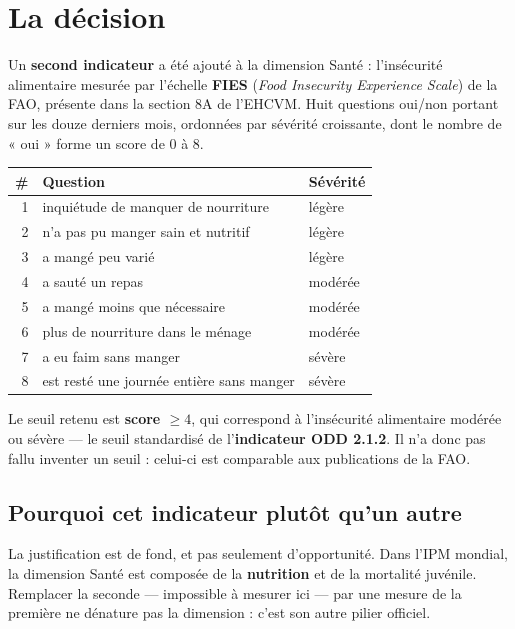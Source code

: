 \documentclass[11pt,a4paper]{article}
\begin{document}
\section{La décision}

Un \textbf{second indicateur} a été ajouté à la dimension Santé : l'insécurité alimentaire mesurée
par l'échelle \textbf{FIES} (\emph{Food Insecurity Experience Scale}) de la FAO, présente dans la
section 8A de l'EHCVM. Huit questions oui/non portant sur les douze derniers mois, ordonnées par
sévérité croissante, dont le nombre de « oui » forme un score de 0 à 8.

\begin{center}
\small
\begin{tabular}{@{}rlp{2.6cm}@{}}
\toprule
\textbf{\#} & \textbf{Question} & \textbf{Sévérité} \\
\midrule
1 & inquiétude de manquer de nourriture & légère \\
2 & n'a pas pu manger sain et nutritif & légère \\
3 & a mangé peu varié & légère \\
4 & a sauté un repas & modérée \\
5 & a mangé moins que nécessaire & modérée \\
6 & plus de nourriture dans le ménage & modérée \\
7 & a eu faim sans manger & sévère \\
8 & est resté une journée entière sans manger & sévère \\
\bottomrule
\end{tabular}
\end{center}

Le seuil retenu est \textbf{score $\ge 4$}, qui correspond à l'insécurité alimentaire modérée ou
sévère --- le seuil standardisé de l'\textbf{indicateur ODD 2.1.2}. Il n'a donc pas fallu inventer
un seuil : celui-ci est comparable aux publications de la FAO.

\subsection{Pourquoi cet indicateur plutôt qu'un autre}

La justification est de fond, et pas seulement d'opportunité. Dans l'IPM mondial, la dimension
Santé est composée de la \textbf{nutrition} et de la mortalité juvénile. Remplacer la seconde
--- impossible à mesurer ici --- par une mesure de la première ne dénature pas la dimension :
c'est son autre pilier officiel.
\end{document}
